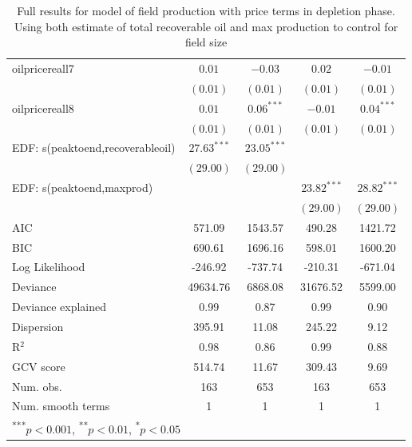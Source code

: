 \documentclass[12pt]{article}
\begin{document}
\begin{table}
\begin{center}
\begin{tabular}{l c c c c }
oilpricereall7                   & $0.01$        & $-0.03$       & $0.02$        & $-0.01$       \\
                                    & $(0.01)$      & $(0.01)$      & $(0.01)$      & $(0.01)$      \\
oilpricereall8                   & $0.01$        & $0.06^{***}$  & $-0.01$       & $0.04^{***}$  \\
                                    & $(0.01)$      & $(0.01)$      & $(0.01)$      & $(0.01)$      \\
EDF: s(peaktoend,recoverableoil) & $27.63^{***}$ & $23.05^{***}$ &               &               \\
                                    & $(29.00)$     & $(29.00)$     &               &               \\
EDF: s(peaktoend,maxprod)        &               &               & $23.82^{***}$ & $28.82^{***}$ \\
                                    &               &               & $(29.00)$     & $(29.00)$     \\
\hline
AIC                                 & 571.09        & 1543.57       & 490.28        & 1421.72       \\
BIC                                 & 690.61        & 1696.16       & 598.01        & 1600.20       \\
Log Likelihood                      & -246.92       & -737.74       & -210.31       & -671.04       \\
Deviance                            & 49634.76      & 6868.08       & 31676.52      & 5599.00       \\
Deviance explained                  & 0.99          & 0.87          & 0.99          & 0.90          \\
Dispersion                          & 395.91        & 11.08         & 245.22        & 9.12          \\
R$^2$                               & 0.98          & 0.86          & 0.99          & 0.88          \\
GCV score                           & 514.74        & 11.67         & 309.43        & 9.69          \\
Num. obs.                           & 163           & 653           & 163           & 653           \\
Num. smooth terms                   & 1             & 1             & 1             & 1             \\
\hline
\multicolumn{5}{l}{\scriptsize{\textsuperscript{***}$p<0.001$, 
  \textsuperscript{**}$p<0.01$, 
  \textsuperscript{*}$p<0.05$}}
\end{tabular}
\caption{Full results for model of field production with price terms in depletion phase.  Using both estimate of total recoverable oil and max production to control for field size}
\label{table:postpeak}
\end{center}
\end{table}
\end{document}
